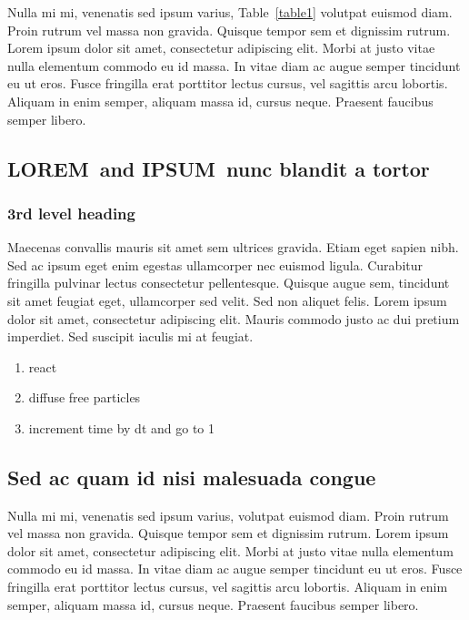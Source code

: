 \documentclass[10pt,letterpaper]{article}
\newcommand{\lorem}{{\bf LOREM}}
\newcommand{\ipsum}{{\bf IPSUM}}
\begin{document}
Nulla mi mi, venenatis sed ipsum varius, Table~\ref{table1} volutpat euismod diam. Proin rutrum vel massa non gravida. Quisque tempor sem et dignissim rutrum. Lorem ipsum dolor sit amet, consectetur adipiscing elit. Morbi at justo vitae nulla elementum commodo eu id massa. In vitae diam ac augue semper tincidunt eu ut eros. Fusce fringilla erat porttitor lectus cursus, vel sagittis arcu lobortis. Aliquam in enim semper, aliquam massa id, cursus neque. Praesent faucibus semper libero.

\subsection*{\lorem\ and \ipsum\ nunc blandit a tortor}
\subsubsection*{3rd level heading} 
Maecenas convallis mauris sit amet sem ultrices gravida. Etiam eget sapien nibh. Sed ac ipsum eget enim egestas ullamcorper nec euismod ligula. Curabitur fringilla pulvinar lectus consectetur pellentesque. Quisque augue sem, tincidunt sit amet feugiat eget, ullamcorper sed velit. Sed non aliquet felis. Lorem ipsum dolor sit amet, consectetur adipiscing elit. Mauris commodo justo ac dui pretium imperdiet. Sed suscipit iaculis mi at feugiat. 

\begin{enumerate}
	\item{react}
	\item{diffuse free particles}
	\item{increment time by dt and go to 1}
\end{enumerate}


\subsection*{Sed ac quam id nisi malesuada congue}

Nulla mi mi, venenatis sed ipsum varius, volutpat euismod diam. Proin rutrum vel massa non gravida. Quisque tempor sem et dignissim rutrum. Lorem ipsum dolor sit amet, consectetur adipiscing elit. Morbi at justo vitae nulla elementum commodo eu id massa. In vitae diam ac augue semper tincidunt eu ut eros. Fusce fringilla erat porttitor lectus cursus, vel sagittis arcu lobortis. Aliquam in enim semper, aliquam massa id, cursus neque. Praesent faucibus semper libero.
\end{document}
